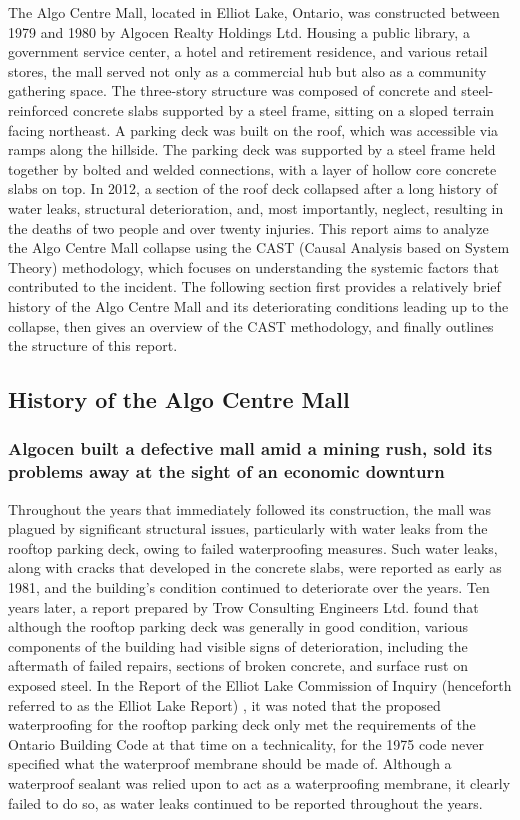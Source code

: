 \documentclass[12pt]{article}
\begin{document}
The Algo Centre Mall, located in Elliot Lake, Ontario, was constructed between 1979 and 1980 by Algocen Realty Holdings Ltd. Housing a public library, a government service center, a hotel and retirement residence, and various retail stores, the mall served not only as a commercial hub but also as a community gathering space. The three-story structure was composed of concrete and steel-reinforced concrete slabs supported by a steel frame, sitting on a sloped terrain facing northeast. A parking deck was built on the roof, which was accessible via ramps along the hillside. The parking deck was supported by a steel frame held together by bolted and welded connections, with a layer of hollow core concrete slabs on top. In 2012, a section of the roof deck collapsed after a long history of water leaks, structural deterioration, and, most importantly, neglect, resulting in the deaths of two people and over twenty injuries. This report aims to analyze the Algo Centre Mall collapse using the CAST (Causal Analysis based on System Theory) methodology, which focuses on understanding the systemic factors that contributed to the incident. The following section first provides a relatively brief history of the Algo Centre Mall and its deteriorating conditions leading up to the collapse, then gives an overview of the CAST methodology, and finally outlines the structure of this  report.

\subsection{History of the Algo Centre Mall}

\subsubsection{Algocen built a defective mall amid a mining rush, sold its problems away at the sight of an economic downturn}

Throughout the years that immediately followed its construction, the mall was plagued by significant structural issues, particularly with water leaks from the rooftop parking deck, owing to failed waterproofing measures. Such water leaks, along with cracks that developed in the concrete slabs, were reported as early as 1981, and the building's condition continued to deteriorate over the years. Ten years later, a report prepared by Trow Consulting Engineers Ltd. found that although the rooftop parking deck was generally in good condition, various components of the building had visible signs of deterioration, including the aftermath of failed repairs, sections of broken concrete, and surface rust on exposed steel. In the Report of the Elliot Lake Commission of Inquiry (henceforth referred to as the Elliot Lake Report) \cite{AlgoLakeReport1}, it was noted that the proposed waterproofing for the rooftop parking deck only met the requirements of the Ontario Building Code at that time on a technicality, for the 1975 code never specified what the waterproof membrane should be made of. Although a waterproof sealant was relied upon to act as a waterproofing membrane, it clearly failed to do so, as water leaks continued to be reported throughout the years. 
\end{document}
